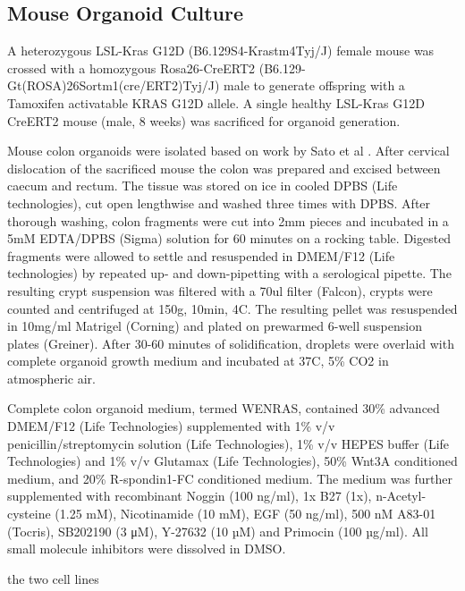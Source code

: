 \begin{flushleft}
\subsection{Mouse Organoid Culture}
A heterozygous LSL-Kras G12D (B6.129S4-Krastm4Tyj/J) female mouse was crossed with a homozygous Rosa26-CreERT2 (B6.129-Gt(ROSA)26Sortm1(cre/ERT2)Tyj/J) male to generate offspring with a Tamoxifen activatable KRAS G12D allele. A single healthy LSL-Kras G12D CreERT2 mouse (male, 8 weeks) was sacrificed for organoid generation. 

Mouse colon organoids were isolated based on work by Sato et al \cite{Sato2009-jw}. After cervical dislocation of the sacrificed mouse the colon was prepared and excised between caecum and rectum. The tissue was stored on ice in cooled DPBS (Life technologies), cut open lengthwise and washed three times with DPBS. After thorough washing, colon fragments were cut into 2mm pieces and incubated in a 5mM EDTA/DPBS (Sigma) solution for 60 minutes on a rocking table. Digested fragments were allowed to settle and resuspended in DMEM/F12 (Life technologies) by repeated up- and down-pipetting with a serological pipette. The resulting crypt suspension was filtered with a 70ul filter (Falcon), crypts were counted and centrifuged at 150g, 10min, 4C. The resulting pellet was resuspended in 10mg/ml Matrigel (Corning) and plated on prewarmed 6-well suspension plates (Greiner). After 30-60 minutes of solidification, droplets were overlaid with complete organoid growth medium and incubated at 37C, 5\% CO2 in atmospheric air.

Complete colon organoid medium, termed WENRAS, contained 30\% advanced DMEM/F12 (Life Technologies) supplemented with 1\% v/v penicillin/streptomycin solution (Life Technologies), 1\% v/v HEPES buffer (Life Technologies) and 1\% v/v Glutamax (Life Technologies), 50\% Wnt3A conditioned medium, and 20\% R-spondin1-FC conditioned medium. 
The medium was further supplemented with recombinant Noggin (100 ng/ml), 1x B27 (1x), n-Acetyl-cysteine (1.25 mM), Nicotinamide (10 mM), EGF (50 ng/ml), 500 nM A83-01 (Tocris), SB202190 (3 μM), Y-27632 (10 µM) and Primocin (100 µg/ml). All small molecule inhibitors were dissolved in DMSO. 

the two cell lines


\end{flushleft}
